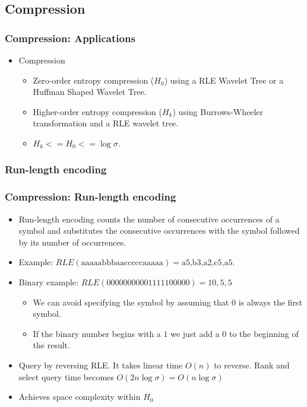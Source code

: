 \documentclass{beamer}
\begin{document}
\subsection{Compression}
\begin{frame}
\frametitle{Compression: Applications}
\begin{itemize}
\item Compression
	\begin{itemize}
	\item Zero-order entropy compression ($H_0$) using a RLE Wavelet Tree or a Huffman Shaped Wavelet Tree.
	\item Higher-order entropy compression ($H_k$) using Burrows-Wheeler transformation and a RLE wavelet tree.
	\item $H_k <= H_0 <= \log \sigma$.
	\end{itemize}
\end{itemize}
\end{frame}

\subsubsection{Run-length encoding}
\begin{frame}
\frametitle{Compression: Run-length encoding}
\begin{itemize}
\item Run-length encoding counts the number of consecutive occurrences of a symbol and substitutes the consecutive occurrences with the symbol followed by its number of occurrences.
\item Example: $RLE(\text{aaaaabbbaacccccaaaaa}) = \text{a5,b3,a2,c5,a5}$.
\item Binary example: $RLE(00000000001111100000) = 10,5,5 $
	\begin{itemize}
	\item We can avoid specifying the symbol by assuming that $0$ is always the first symbol.
	\item If the binary number begins with a $1$ we just add a $0$ to the beginning of the result.
	\end{itemize}
\item Query by reversing RLE. It takes linear time $O(n)$ to reverse. Rank and select query time becomes $O(2n \log \sigma) = O(n \log \sigma)$
\item Achieves space complexity within $H_0$
\end{itemize}
\end{frame}
\end{document}
